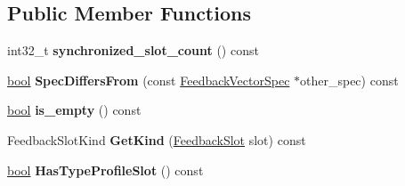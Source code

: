 \subsection*{Public Member Functions}
\begin{DoxyCompactItemize}
\item 
\mbox{\label{classv8_1_1internal_1_1FeedbackMetadata_a190337368577bb8109fb517bddb96be3}} 
int32\+\_\+t {\bfseries synchronized\+\_\+slot\+\_\+count} () const
\item 
\mbox{\label{classv8_1_1internal_1_1FeedbackMetadata_ae1c4f3bba6268d7b9939ae62d11bc45b}} 
\mbox{\hyperlink{classbool}{bool}} {\bfseries Spec\+Differs\+From} (const \mbox{\hyperlink{classv8_1_1internal_1_1FeedbackVectorSpec}{Feedback\+Vector\+Spec}} $\ast$other\+\_\+spec) const
\item 
\mbox{\label{classv8_1_1internal_1_1FeedbackMetadata_af643b4f55ecf4fc95d488375dc679b2e}} 
\mbox{\hyperlink{classbool}{bool}} {\bfseries is\+\_\+empty} () const
\item 
\mbox{\label{classv8_1_1internal_1_1FeedbackMetadata_a346ef6fc6f88122ec0bd64e9e653bd26}} 
Feedback\+Slot\+Kind {\bfseries Get\+Kind} (\mbox{\hyperlink{classv8_1_1internal_1_1FeedbackSlot}{Feedback\+Slot}} slot) const
\item 
\mbox{\label{classv8_1_1internal_1_1FeedbackMetadata_a7ce2ca4d950347019664ce7f93a4cac8}} 
\mbox{\hyperlink{classbool}{bool}} {\bfseries Has\+Type\+Profile\+Slot} () const
\end{DoxyCompactItemize}
